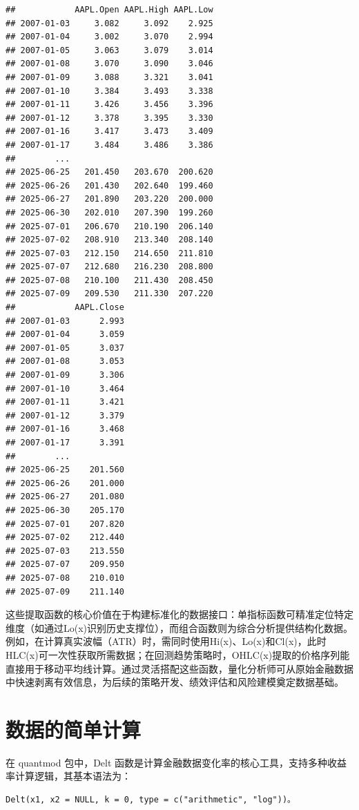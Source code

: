 \documentclass[]{ctexbook}
\begin{document}
\begin{verbatim}
##            AAPL.Open AAPL.High AAPL.Low
## 2007-01-03     3.082     3.092    2.925
## 2007-01-04     3.002     3.070    2.994
## 2007-01-05     3.063     3.079    3.014
## 2007-01-08     3.070     3.090    3.046
## 2007-01-09     3.088     3.321    3.041
## 2007-01-10     3.384     3.493    3.338
## 2007-01-11     3.426     3.456    3.396
## 2007-01-12     3.378     3.395    3.330
## 2007-01-16     3.417     3.473    3.409
## 2007-01-17     3.484     3.486    3.386
##        ...                             
## 2025-06-25   201.450   203.670  200.620
## 2025-06-26   201.430   202.640  199.460
## 2025-06-27   201.890   203.220  200.000
## 2025-06-30   202.010   207.390  199.260
## 2025-07-01   206.670   210.190  206.140
## 2025-07-02   208.910   213.340  208.140
## 2025-07-03   212.150   214.650  211.810
## 2025-07-07   212.680   216.230  208.800
## 2025-07-08   210.100   211.430  208.450
## 2025-07-09   209.530   211.330  207.220
##            AAPL.Close
## 2007-01-03      2.993
## 2007-01-04      3.059
## 2007-01-05      3.037
## 2007-01-08      3.053
## 2007-01-09      3.306
## 2007-01-10      3.464
## 2007-01-11      3.421
## 2007-01-12      3.379
## 2007-01-16      3.468
## 2007-01-17      3.391
##        ...           
## 2025-06-25    201.560
## 2025-06-26    201.000
## 2025-06-27    201.080
## 2025-06-30    205.170
## 2025-07-01    207.820
## 2025-07-02    212.440
## 2025-07-03    213.550
## 2025-07-07    209.950
## 2025-07-08    210.010
## 2025-07-09    211.140
\end{verbatim}

这些提取函数的核心价值在于构建标准化的数据接口：单指标函数可精准定位特定维度（如通过Lo(x)识别历史支撑位），而组合函数则为综合分析提供结构化数据。例如，在计算真实波幅（ATR）时，需同时使用Hi(x)、Lo(x)和Cl(x)，此时HLC(x)可一次性获取所需数据；在回测趋势策略时，OHLC(x)提取的价格序列能直接用于移动平均线计算。通过灵活搭配这些函数，量化分析师可从原始金融数据中快速剥离有效信息，为后续的策略开发、绩效评估和风险建模奠定数据基础。

\section{数据的简单计算}\label{ux6570ux636eux7684ux7b80ux5355ux8ba1ux7b97}

在 quantmod 包中，Delt 函数是计算金融数据变化率的核心工具，支持多种收益率计算逻辑，其基本语法为：

\begin{verbatim}
Delt(x1, x2 = NULL, k = 0, type = c("arithmetic", "log"))。
\end{verbatim}
\end{document}
